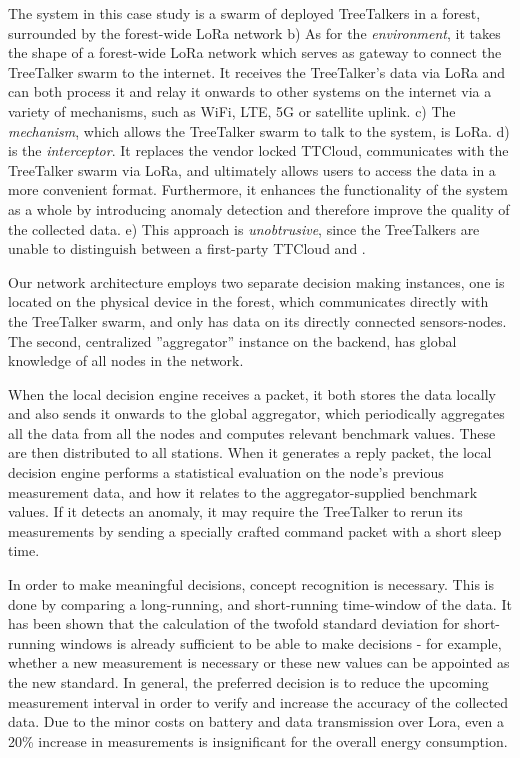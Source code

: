 The system in this case study is a swarm of deployed TreeTalkers in a forest,
surrounded by the forest-wide LoRa network 
b) As for the \textit{environment}, it takes the shape of a forest-wide LoRa network which serves as gateway to connect the TreeTalker swarm to the internet.
It receives the TreeTalker's data via LoRa and can both process it and relay it onwards to other systems on the internet via a variety of mechanisms, such as WiFi, LTE, 5G or satellite uplink.
c) The \textit{mechanism}, which allows the TreeTalker swarm to talk to the system, is LoRa.
d) \textit{\ttt} is the \textit{interceptor}.
It replaces the vendor locked TTCloud, communicates with the TreeTalker swarm via LoRa, and ultimately allows users to access the data in a more convenient format.
Furthermore, it enhances the functionality of the system as a whole by introducing anomaly detection and therefore improve the quality of the collected data.
e) This approach is \textit{unobtrusive}, since the TreeTalkers are unable to distinguish between a first-party TTCloud and \ttt.

Our network architecture employs two separate decision making instances, one is located on the physical device in the forest, which communicates directly with the TreeTalker swarm, and only has data on its directly connected sensors-nodes.
The second, centralized ''aggregator'' instance on the backend, has global knowledge of all nodes in the network.

When the local decision engine receives a packet, it both stores the data locally and also sends it onwards to the global aggregator, which periodically aggregates all the data from all the nodes and computes relevant benchmark values. 
These are then distributed to all stations.
When it generates a reply packet, the local decision engine performs a statistical evaluation on the node's previous measurement data, and how it relates to the aggregator-supplied benchmark values.
If it detects an anomaly, it may require the TreeTalker to rerun its measurements by sending a specially crafted command packet with a short sleep time.

In order to make meaningful decisions, concept recognition is necessary.
This is done by comparing a long-running, and short-running time-window of the data.
It has been shown that the calculation of the twofold standard deviation for short-running windows is already sufficient to be able to make decisions - for example, whether a new measurement is necessary or these new values can be appointed as the new standard.
In general, the preferred decision is to reduce the upcoming measurement interval in order to verify and increase the accuracy of the collected data.
Due to the minor costs on battery and data transmission over Lora, even a 20\% increase in measurements is insignificant for the overall energy consumption. 

